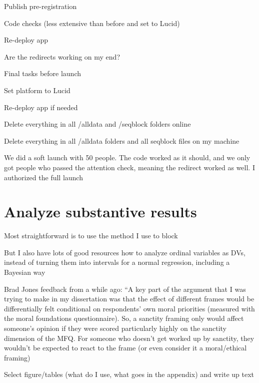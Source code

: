 \documentclass[12pt]{article}
\begin{document}
\begin{coi}
\begin{coi}
				\item Publish pre-registration
			\end{coi}
		\item Code checks (less extensive than before and set to Lucid)
			\begin{coi}
				\item Re-deploy app
				\item Are the redirects working on my end?
			\end{coi}
		\item Final tasks before launch
			\begin{coi}
				\item Set platform to Lucid
				\item Re-deploy app if needed
				\item Delete everything in all /alldata and /seqblock folders online 
				\item Delete everything in all /alldata folders and all seqblock files on my machine
			\end{coi}
		\item We did a soft launch with 50 people. The code worked as it should, and we only got people who passed the attention check, meaning the redirect worked as well. I authorized the full launch			
	\end{coi}
	
\section*{Analyze substantive results}
	\begin{coi}
		\item Most straightforward is to use the method I use to block
		\item But I also have lots of good resources how to analyze ordinal variables as DVs, instead of turning them into intervals for a normal regression, including a Bayesian way
		\item Brad Jones feedback from a while ago: ``A key part of the argument that I was trying to make in my dissertation was that the effect of different frames would be differentially felt conditional on respondents' own moral priorities (measured with the moral foundations questionnaire). So, a sanctity framing only would affect someone's opinion if they were scored particularly highly on the sanctity dimension of the MFQ. For someone who doesn't get worked up by sanctity, they wouldn't be expected to react to the frame (or even consider it a moral/ethical framing)
		\item Select figure/tables (what do I use, what goes in the appendix) and write up text
	\end{coi}
	
\end{document}
